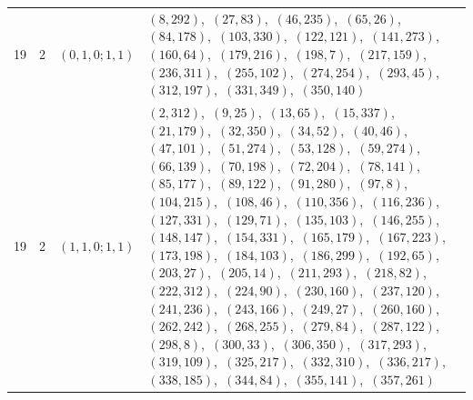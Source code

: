 \documentclass[11pt]{article}
\begin{document}
\begin{longtable}{@{}rrl>{\raggedright\arraybackslash}p{}@{}}
19 & 2 & $(0,1,0;1,1)$ & $(8,292)$,\allowbreak\ $(27,83)$,\allowbreak\ $(46,235)$,\allowbreak\ $(65,26)$,\allowbreak\ $(84,178)$,\allowbreak\ $(103,330)$,\allowbreak\ $(122,121)$,\allowbreak\ $(141,273)$,\allowbreak\ $(160,64)$,\allowbreak\ $(179,216)$,\allowbreak\ $(198,7)$,\allowbreak\ $(217,159)$,\allowbreak\ $(236,311)$,\allowbreak\ $(255,102)$,\allowbreak\ $(274,254)$,\allowbreak\ $(293,45)$,\allowbreak\ $(312,197)$,\allowbreak\ $(331,349)$,\allowbreak\ $(350,140)$\\
19 & 2 & $(1,1,0;1,1)$ & $(2,312)$,\allowbreak\ $(9,25)$,\allowbreak\ $(13,65)$,\allowbreak\ $(15,337)$,\allowbreak\ $(21,179)$,\allowbreak\ $(32,350)$,\allowbreak\ $(34,52)$,\allowbreak\ $(40,46)$,\allowbreak\ $(47,101)$,\allowbreak\ $(51,274)$,\allowbreak\ $(53,128)$,\allowbreak\ $(59,274)$,\allowbreak\ $(66,139)$,\allowbreak\ $(70,198)$,\allowbreak\ $(72,204)$,\allowbreak\ $(78,141)$,\allowbreak\ $(85,177)$,\allowbreak\ $(89,122)$,\allowbreak\ $(91,280)$,\allowbreak\ $(97,8)$,\allowbreak\ $(104,215)$,\allowbreak\ $(108,46)$,\allowbreak\ $(110,356)$,\allowbreak\ $(116,236)$,\allowbreak\ $(127,331)$,\allowbreak\ $(129,71)$,\allowbreak\ $(135,103)$,\allowbreak\ $(146,255)$,\allowbreak\ $(148,147)$,\allowbreak\ $(154,331)$,\allowbreak\ $(165,179)$,\allowbreak\ $(167,223)$,\allowbreak\ $(173,198)$,\allowbreak\ $(184,103)$,\allowbreak\ $(186,299)$,\allowbreak\ $(192,65)$,\allowbreak\ $(203,27)$,\allowbreak\ $(205,14)$,\allowbreak\ $(211,293)$,\allowbreak\ $(218,82)$,\allowbreak\ $(222,312)$,\allowbreak\ $(224,90)$,\allowbreak\ $(230,160)$,\allowbreak\ $(237,120)$,\allowbreak\ $(241,236)$,\allowbreak\ $(243,166)$,\allowbreak\ $(249,27)$,\allowbreak\ $(260,160)$,\allowbreak\ $(262,242)$,\allowbreak\ $(268,255)$,\allowbreak\ $(279,84)$,\allowbreak\ $(287,122)$,\allowbreak\ $(298,8)$,\allowbreak\ $(300,33)$,\allowbreak\ $(306,350)$,\allowbreak\ $(317,293)$,\allowbreak\ $(319,109)$,\allowbreak\ $(325,217)$,\allowbreak\ $(332,310)$,\allowbreak\ $(336,217)$,\allowbreak\ $(338,185)$,\allowbreak\ $(344,84)$,\allowbreak\ $(355,141)$,\allowbreak\ $(357,261)$\\

\end{longtable}
\end{document}
